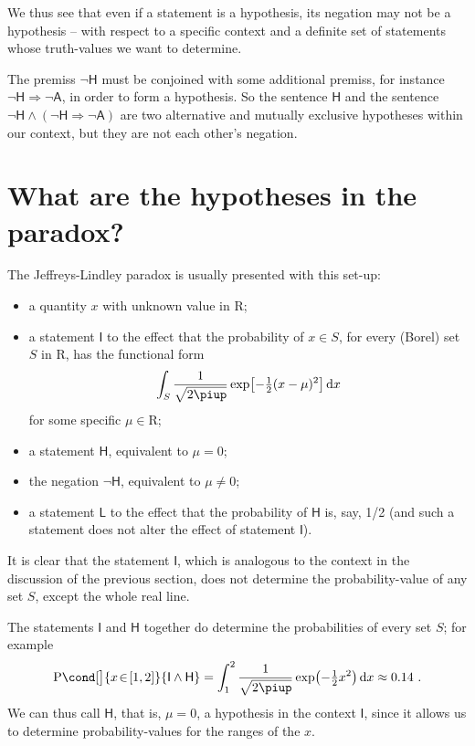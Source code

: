\documentclass[\ifafour a4paper,12pt,\else a5paper,10pt,\fi%
onecolumn,oneside,article,%
british%
]{memoir}
\theoremstyle{remark}
\theoremstyle{innote}
\newcommand*{\pu}{\piup}%
\newcommand*{\di}{\mathrm{d}}%
\newcommand*{\RR}{\bm{\mathrm{R}}}
\newcommand*{\limplies}{\mathbin{\Rightarrow}}%
\DeclarePairedDelimiter\clcl{[}{]}
\newcommand*{\p}{\mathrm{P}}%
\renewcommand*{\|}[1][]{\nonscript\,#1\vert\nonscript\;\mathopen{}}
\newcommand*{\yH}{\mathsf{H}}
\newcommand*{\yA}{\mathsf{A}}
\newcommand*{\yI}{\mathsf{I}}
\newcommand*{\yL}{\mathsf{L}}
\newcommand*{\rin}{\mathrel{\!\in\!}}
\begin{document}
\smallskip

We thus see that even if a statement is a hypothesis, its negation may not
be a hypothesis -- with respect to a specific context and a definite set of
statements whose truth-values we want to determine.

The premiss $\lnot\yH$ must be conjoined with some additional premiss, for
instance $\lnot\yH \limplies \lnot\yA$, in order to form a hypothesis. So
the sentence $\yH$ and the sentence
$\lnot\yH \land (\lnot\yH \limplies \lnot\yA)$ are two alternative and
mutually exclusive hypotheses within our context, but they are not each
other's negation.


\section{What are the hypotheses in the paradox?}
\label{sec:hypotheses_paradox}

The Jeffreys-Lindley paradox is usually presented with this set-up:
\begin{itemize}[wide]
\item a quantity $x$ with unknown value in $\RR$;
\item a statement $\yI$ to the effect that the probability of $x \in S$,
  for every (Borel) set $S$ in $\RR$, has the functional form
  \begin{equation}
    \label{eq:functional_form_N}
    \int_{S}\frac{1}{\sqrt{2 \pu}}
    \exp\bigl[-\tfrac{1}{2}(x-\mu)^{2}\bigl]\,\di x
  \end{equation}
  for some specific $\mu \in \RR$;
\item a statement $\yH$, equivalent to $\mu = 0$;
\item the negation $\lnot \yH$, equivalent to $\mu \ne 0$;
\item a statement $\yL$ to the effect that the probability of $\yH$ is,
  say, 1/2 (and such a statement does not alter the effect of statement
  $\yI$).
\end{itemize}

It is clear that the statement $\yI$, which is analogous to the context in
the discussion of the previous section, does not determine the
probability-value of any set $S$, except the whole real line.

The statements $\yI$ and $\yH$ together do determine the probabilities of
every set $S$; for example
\begin{equation}
  \label{eq:example_determined_prob}
  \p\cond[\big]{x \rin \clcl{1,2}}{\yI \land \yH} =
  \int_{1}^{2}\frac{1}{\sqrt{2 \pu}}
    \exp\bigl(-\tfrac{1}{2}x^{2}\bigl)\,\di x \approx 0.14 \ .
\end{equation}
We can thus call $\yH$, that is, $\mu = 0$, a hypothesis in the context
$\yI$, since it allows us to determine probability-values for the ranges of
the  $x$.
\end{document}
